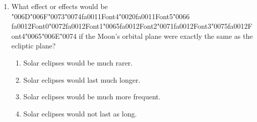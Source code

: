 \documentclass[12pt]{article}
\begin{document}
\begin{enumerate}[label=\arabic*.]
\begin{enumerate}[label=(\alph*)]
    \item Asteroids emit pulsed radiation
    \item Asteroids emit a lot of their own radiation
    \item They reflect enough of the sun's light to make them brighter than most background stars
    \item Asteroids have substantial motion relative to the background stars
\end{enumerate}
\item What effect or effects would be {\char"006D}{\char"006F}{\char"0073}{\char"0074}{\csname fa0011Font4\endcsname\char"0020}{\csname fa0011Font5\endcsname\char"0066} {\csname fa0012Font0\endcsname\char"0072}{\csname fa0012Font1\endcsname\char"0065}{\csname fa0012Font2\endcsname\char"0071}{\csname fa0012Font3\endcsname\char"0075}{\csname fa0012Font4\endcsname\char"0065}{\char"006E}{\char"0074} if the Moon's orbital plane were exactly
the same as the ecliptic plane?
\begin{enumerate}[label=(\alph*)]
    \item Solar eclipses would be much rarer.
    \item Solar eclipses would last much longer.
    \item Solar eclipses would be much more frequent.
    \item Solar eclipses would not last as long.
\end{enumerate}
\end{enumerate}
\end{document}
